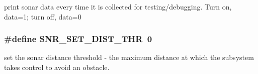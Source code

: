 print sonar data every time it is collected for testing/debugging. Turn on, data=1; turn off, data=0 \hypertarget{group__sonar__commands_gaa5d2a4af7281457c965323f4c26ea9ab}{
\subsubsection[{S\-N\-R\-\_\-\-S\-E\-T\-\_\-\-D\-I\-S\-T\-\_\-\-T\-H\-R}]{\setlength{\rightskip}{0pt plus 5cm}\#define S\-N\-R\-\_\-\-S\-E\-T\-\_\-\-D\-I\-S\-T\-\_\-\-T\-H\-R~0}}\label{group__sonar__commands_gaa5d2a4af7281457c965323f4c26ea9ab}
set the sonar distance threshold -\/ the maximum distance at which the subsystem takes control to avoid an obstacle. 
